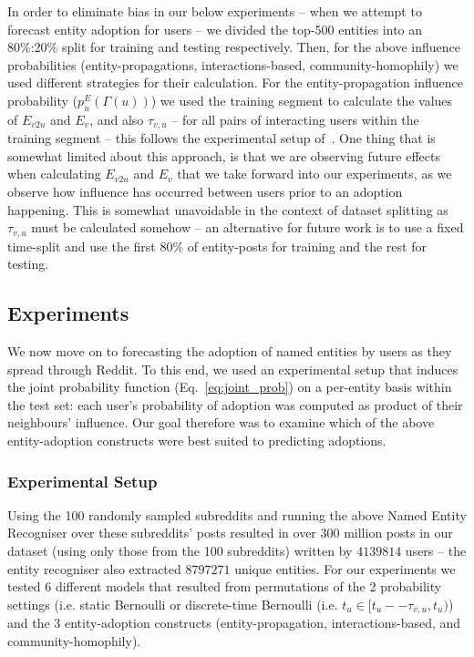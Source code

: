 \documentclass[sigconf]{acmart}
\begin{document}
In order to eliminate bias in our below experiments -- when we attempt to forecast entity adoption for users -- we divided the top-500 entities into an 80\%:20\% split for training and testing respectively.
Then, for the above influence probabilities (entity-propagations, interactions-based, community-homophily) we used different strategies for their calculation.
For the entity-propagation influence probability ($p^E_u(\Gamma(u))$) we used the training segment to calculate the values of $E_{v2u}$ and $E_v$, and also $\tau_{v,u}$ -- for all pairs of interacting users within the training segment -- this follows the experimental setup of~\cite{goyal2010learning}.
One thing that is somewhat limited about this approach, is that we are observing future effects when calculating $E_{v2u}$ and $E_v$ that we take forward into our experiments, as we observe how influence has occurred between users prior to an adoption happening.
This is somewhat unavoidable in the context of dataset splitting as $\tau_{v,u}$ must be calculated somehow -- an alternative for future work is to use a fixed time-split and use the first 80\% of entity-posts for training and the rest for testing.

\subsection{Experiments}
We now move on to forecasting the adoption of named entities by users as they spread through Reddit.
To this end, we used an experimental setup that induces the joint probability function (Eq.~\ref{eq:joint_prob}) on a per-entity basis within the test set: each user's probability of adoption was computed as product of their neighbours' influence.
Our goal therefore was to examine which of the above entity-adoption constructs were best suited to predicting adoptions.

\subsubsection{Experimental Setup}
Using the 100 randomly sampled subreddits and running the above Named Entity Recogniser over these subreddits' posts resulted in over $300$ million posts in our dataset (using only those from the 100 subreddits) written by $4 139 814$ users -- the entity recogniser also extracted $8 797 271$ unique entities.
For our experiments we tested 6 different models that resulted from permutations of the 2 probability settings (i.e. static Bernoulli or discrete-time Bernoulli (i.e. $t_u \in [t_u -- \tau_{v,u}, t_u)$) and the 3 entity-adoption constructs (entity-propagation, interactions-based, and community-homophily).
\end{document}
